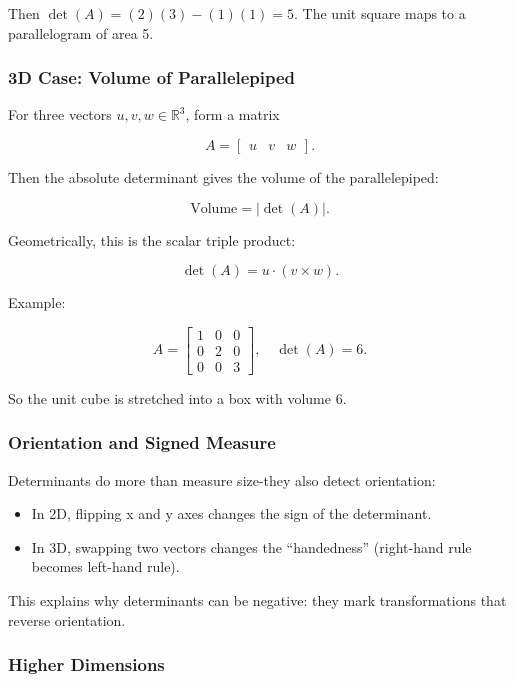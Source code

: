 \documentclass[
  letterpaper,
  DIV=11,
  numbers=noendperiod]{scrreprt}
\providecommand{\tightlist}{%
  \setlength{\itemsep}{0pt}\setlength{\parskip}{0pt}}
\begin{document}
Then \(\det(A) = (2)(3) - (1)(1) = 5\). The unit square maps to a
parallelogram of area 5.

\subsubsection{3D Case: Volume of
Parallelepiped}\label{d-case-volume-of-parallelepiped}

For three vectors \(u,v,w \in \mathbb{R}^3\), form a matrix

\[
A = \begin{bmatrix} u & v & w \end{bmatrix}.
\]

Then the absolute determinant gives the volume of the parallelepiped:

\[
\text{Volume} = |\det(A)|.
\]

Geometrically, this is the scalar triple product:

\[
\det(A) = u \cdot (v \times w).
\]

Example:

\[
A = \begin{bmatrix} 1 & 0 & 0 \\ 0 & 2 & 0 \\ 0 & 0 & 3 \end{bmatrix}, \quad \det(A) = 6.
\]

So the unit cube is stretched into a box with volume 6.

\subsubsection{Orientation and Signed
Measure}\label{orientation-and-signed-measure}

Determinants do more than measure size-they also detect orientation:

\begin{itemize}
\tightlist
\item
  In 2D, flipping x and y axes changes the sign of the determinant.
\item
  In 3D, swapping two vectors changes the ``handedness'' (right-hand
  rule becomes left-hand rule).
\end{itemize}

This explains why determinants can be negative: they mark
transformations that reverse orientation.

\subsubsection{Higher Dimensions}\label{higher-dimensions}
\end{document}
